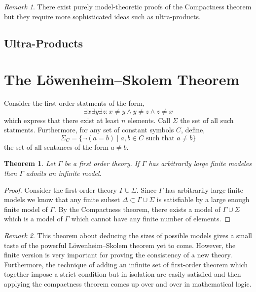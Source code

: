 \documentclass[12pt]{article}
\newenvironment{definition}[1][Definition:]{\begin{trivlist}
\item[\hskip \labelsep {\bfseries #1}]}{\end{trivlist}}
\theoremstyle{theorem}
\newtheorem{theorem}{Theorem}[section]
\theoremstyle{definition}
\theoremstyle{definition}
\theoremstyle{remark}
\theoremstyle{definition}
\theoremstyle{remark}
\newtheorem{remark}{Remark}[subsection]
\begin{document}
\begin{remark}
There exist purely model-theoretic proofs of the Compactness theorem but they require more sophisticated ideas such as ultra-products.
\end{remark}


\subsection{Ultra-Products}

\section{The L\"{o}wenheim–Skolem Theorem}

\begin{definition}
Consider the first-order statments of the form,
\[ \exists x \exists y \exists z : x \neq y \wedge y \neq z \wedge z \neq x \]
which express that there exist at least $n$ elements. Call $\Sigma$ the set of all such statments. Furthermore, for any set of constant symbols $C$, define,
\[ \Sigma_C = \{ \neg (a = b) \mid a, b \in C \text{ such that } a \neq b \} \]
the set of all sentances of the form $a \neq b$.
\end{definition}

\begin{theorem}
Let $\Gamma$ be a first order theory. If $\Gamma$ has arbitrarily large finite modeles then $\Gamma$ admits an infinite model.
\end{theorem}

\begin{proof}
Consider the first-order theory $\Gamma \cup \Sigma$. Since $\Gamma$ has arbitrarily large finite models we know that any finite subset $\Delta \subset \Gamma \cup \Sigma$ is satisfiable by a large enough finite model of $\Gamma$. By the Compactness theorem, there exists a model of $\Gamma \cup \Sigma$ which is a model of $\Gamma$ which cannot have any finite number of elements. 
\end{proof}

\begin{remark}
This theorem about deducing the sizes of possible models gives a small taste of the powerful L\"{o}wenheim–Skolem theorem yet to come. However, the finite version is very important for proving the consistency of a new theory. Furthermore, the technique of adding an infinite set of first-order theorem which together impose a strict condition but in isolation are easily satisfied and then applying the compactness theorem comes up over and over in mathematical logic. 
\end{remark}
\end{document}
